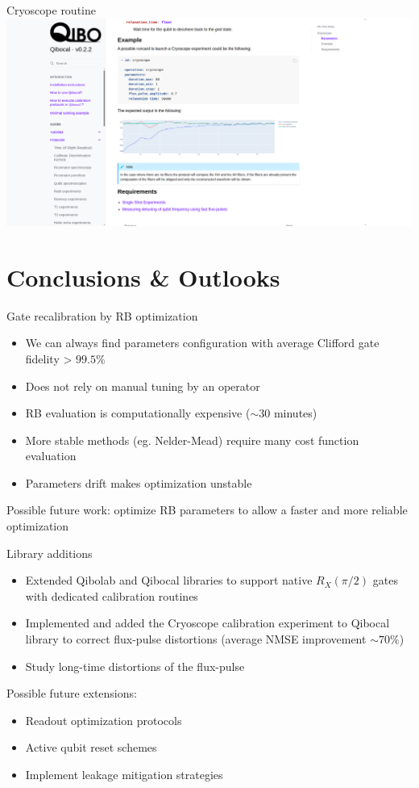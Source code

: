 \documentclass[aspectratio=169,10pt]{beamer}
\begin{document}
\begin{frame}{Cryoscope routine}
  \centering
  \includegraphics[height=\textheight]{figures/cryoscope_routine.png}
\end{frame}


\section{Conclusions \& Outlooks}

\begin{frame}{Gate recalibration by RB optimization}
  \begin{itemize}
    \item[\ding{51}] We can always find parameters configuration with average Clifford gate fidelity > $99.5\%$
    \item[\ding{51}] Does not rely on manual tuning by an operator
    \item[\ding{55}] RB evaluation is computationally expensive ($\sim 30$ minutes)
    \item[\ding{55}] More stable methods (eg. Nelder-Mead) require many cost function evaluation
    \item[\ding{55}] Parameters drift makes optimization unstable
  \end{itemize}
  Possible future work: optimize RB parameters to allow a faster and more reliable optimization
\end{frame}

\begin{frame}{Library additions}
  \begin{itemize}
    \item[\ding{51}] Extended Qibolab and Qibocal libraries to support native $R_X(\pi/2)$ gates with dedicated calibration routines
    \item[\ding{51}] Implemented and added the Cryoscope calibration experiment to Qibocal library to correct flux-pulse distortions (average NMSE improvement $\sim 70\%$)
    \item[\ding{55}] Study long-time distortions of the flux-pulse
  \end{itemize}
  Possible future extensions: 
  \begin{itemize}[label={\raisebox{0.2ex}{\tiny$\bullet$}}]
    \item Readout optimization protocols
    \item Active qubit reset schemes
    \item Implement leakage mitigation strategies
  \end{itemize}
\end{frame}
\end{document}
